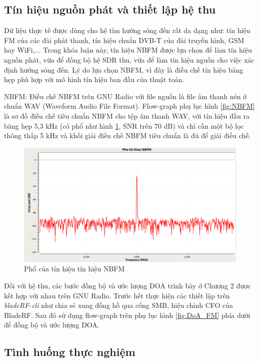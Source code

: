 \subsection{Tín hiệu nguồn phát và thiết lập hệ thu}

Dữ liệu thực tế được dùng cho hệ tìm hướng sóng đến rất da dạng như: tín hiệu FM của các đài phát thanh, tín hiệu chuẩn DVB-T của đài truyền hình, GSM hay WiFi,... Trong khóa luận này, tín hiệu NBFM được lựa chọn để làm tín hiệu nguồn phát, vừa để đồng bộ hệ SDR thu, vừa để làm tín hiệu nguồn cho việc xác định hướng sóng đến. Lý do lựa chọn NBFM, vì đây là điều chế tín hiệu băng hẹp phù hợp với mô hình tín hiệu ban đầu của thuật toán.

NBFM: Điều chế NBFM trên GNU Radio với file nguồn là file âm thanh nén ở chuẩn WAV (Waveform Audio File Format). Flow-graph phụ lục hình \ref{fig:NBFM} là sơ đồ điều chế tiêu chuẩn NBFM cho tệp âm thanh WAV, với tín hiệu đầu ra băng hẹp 5,3 kHz (có phổ như hình \ref{fig:nbfmspectrum}, SNR trên 70 dB) và chỉ cần một bộ lọc thông thấp 5 kHz và khối giải điều chế NBFM tiêu chuẩn là đủ để giải điều chế.
\begin{figure} [!h]
	\centering
	\includegraphics[width=1\linewidth]{figures/nbfmspectrum.png}
	\caption{Phổ của tín hiệu tín hiệu NBFM}
	\label{fig:nbfmspectrum}
\end{figure}

Đối với hệ thu, các bước đồng bộ và ước lượng DOA trình bày ở Chương 2 được kết hợp với nhau trên GNU Radio. Trước hết thực hiện các thiết lập trên \textit{bladeRF-cli} như chia sẻ xung đồng hồ qua cổng SMB, hiệu chỉnh CFO của BladeRF. Sau đó sử dụng flow-graph trên phụ lục hình \ref{fig:DoA_FM} phía dưới để đồng bộ và ước lượng DOA. 

\subsection{Tình huống thực nghiệm}

